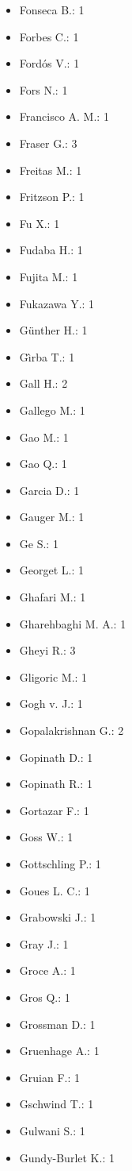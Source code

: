 \begin{itemize}
\item Fonseca B.: 1
\item Forbes C.: 1
\item Ford\'{o}s V.: 1
\item Fors N.: 1
\item Francisco A. M.: 1
\item Fraser G.: 3
\item Freitas M.: 1
\item Fritzson P.: 1
\item Fu X.: 1
\item Fudaba H.: 1
\item Fujita M.: 1
\item Fukazawa Y.: 1
\item G\"{u}nther H.: 1
\item G\^{\i}rba T.: 1
\item Gall H.: 2
\item Gallego M.: 1
\item Gao M.: 1
\item Gao Q.: 1
\item Garcia D.: 1
\item Gauger M.: 1
\item Ge S.: 1
\item Georget L.: 1
\item Ghafari M.: 1
\item Gharehbaghi M. A.: 1
\item Gheyi R.: 3
\item Gligoric M.: 1
\item Gogh v. J.: 1
\item Gopalakrishnan G.: 2
\item Gopinath D.: 1
\item Gopinath R.: 1
\item Gortazar F.: 1
\item Goss W.: 1
\item Gottschling P.: 1
\item Goues L. C.: 1
\item Grabowski J.: 1
\item Gray J.: 1
\item Groce A.: 1
\item Gros Q.: 1
\item Grossman D.: 1
\item Gruenhage A.: 1
\item Gruian F.: 1
\item Gschwind T.: 1
\item Gulwani S.: 1
\item Gundy-Burlet K.: 1

\end{itemize}
